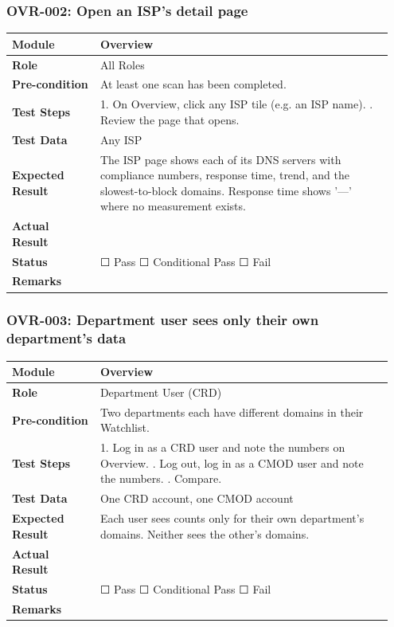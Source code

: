 \documentclass[10pt]{article}
\begin{document}
\subsubsection*{OVR-002: Open an ISP's detail page}
\begin{longtable}{p{0.22\linewidth}p{0.73\linewidth}}
\hline
\textbf{Module} & Overview \\ \hline
\textbf{Role} & All Roles \\ \hline
\textbf{Pre-condition} & At least one scan has been completed. \\ \hline
\textbf{Test Steps} & 1. On Overview, click any ISP tile (e.g. an ISP name). \newline 2. Review the page that opens. \\ \hline
\textbf{Test Data} & Any ISP \\ \hline
\textbf{Expected Result} & The ISP page shows each of its DNS servers with compliance numbers, response time, trend, and the slowest-to-block domains. Response time shows '—' where no measurement exists. \\ \hline
\textbf{Actual Result} & \newline \newline \\ \hline
\textbf{Status} & ☐ Pass \quad ☐ Conditional Pass \quad ☐ Fail \\ \hline
\textbf{Remarks} & \newline \\ \hline
\end{longtable}
\subsubsection*{OVR-003: Department user sees only their own department's data}
\begin{longtable}{p{0.22\linewidth}p{0.73\linewidth}}
\hline
\textbf{Module} & Overview \\ \hline
\textbf{Role} & Department User (CRD) \\ \hline
\textbf{Pre-condition} & Two departments each have different domains in their Watchlist. \\ \hline
\textbf{Test Steps} & 1. Log in as a CRD user and note the numbers on Overview. \newline 2. Log out, log in as a CMOD user and note the numbers. \newline 3. Compare. \\ \hline
\textbf{Test Data} & One CRD account, one CMOD account \\ \hline
\textbf{Expected Result} & Each user sees counts only for their own department's domains. Neither sees the other's domains. \\ \hline
\textbf{Actual Result} & \newline \newline \\ \hline
\textbf{Status} & ☐ Pass \quad ☐ Conditional Pass \quad ☐ Fail \\ \hline
\textbf{Remarks} & \newline \\ \hline
\end{longtable}
\end{document}
